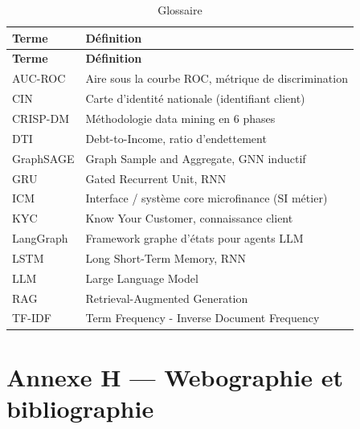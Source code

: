 \begin{longtable}{|p{3.5cm}|p{10cm}|}
  \caption{Glossaire} \\
  \hline
  \textbf{Terme} & \textbf{Définition} \\
  \hline
  \endfirsthead
  \hline
  \textbf{Terme} & \textbf{Définition} \\
  \hline
  \endhead
  AUC-ROC & Aire sous la courbe ROC, métrique de discrimination \\
  \hline
  CIN & Carte d'identité nationale (identifiant client) \\
  \hline
  CRISP-DM & Méthodologie data mining en 6 phases \\
  \hline
  DTI & Debt-to-Income, ratio d'endettement \\
  \hline
  GraphSAGE & Graph Sample and Aggregate, GNN inductif \\
  \hline
  GRU & Gated Recurrent Unit, RNN \\
  \hline
  ICM & Interface / système core microfinance (SI métier) \\
  \hline
  KYC & Know Your Customer, connaissance client \\
  \hline
  LangGraph & Framework graphe d'états pour agents LLM \\
  \hline
  LSTM & Long Short-Term Memory, RNN \\
  \hline
  LLM & Large Language Model \\
  \hline
  RAG & Retrieval-Augmented Generation \\
  \hline
  TF-IDF & Term Frequency - Inverse Document Frequency \\
  \hline
\end{longtable}

\chapter{Annexe H — Webographie et bibliographie}
\label{ann:bib}

